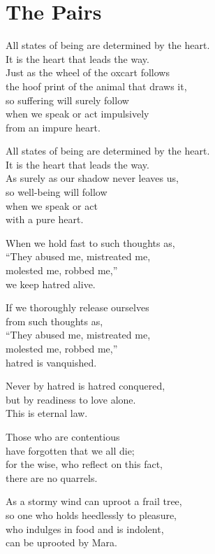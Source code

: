 
\chapter{The Pairs}

All states of being are determined by the heart.\\
It is the heart that leads the way.\\
Just as the wheel of the oxcart follows\\
the hoof print of the animal that draws it,\\
so suffering will surely follow\\
when we speak or act impulsively\\
from an impure heart.


All states of being are determined by the heart.\\
It is the heart that leads the way.\\
As surely as our shadow never leaves us,\\
so well-being will follow\\
when we speak or act\\
with a pure heart.


When we hold fast to such thoughts as,\\
“They abused me, mistreated me,\\
molested me, robbed me,”\\
we keep hatred alive.


If we thoroughly release ourselves\\
from such thoughts as,\\
“They abused me, mistreated me,\\
molested me, robbed me,”\\
hatred is vanquished.


Never by hatred is hatred conquered,\\
but by readiness to love alone.\\
This is eternal law.



Those who are contentious\\
have forgotten that we all die;\\
for the wise, who reflect on this fact,\\
there are no quarrels.


As a stormy wind can uproot a frail tree,\\
so one who holds heedlessly to pleasure,\\
who indulges in food and is indolent,\\
can be uprooted by Mara.


